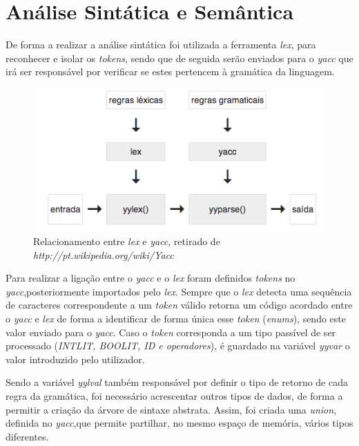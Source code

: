 \documentclass[12pt]{article}
\begin{document}
	
\pagebreak

\section{Análise Sintática e Semântica}
De forma a realizar a análise sintática foi utilizada a ferramenta \emph{lex}, para reconhecer e isolar os \emph{tokens}, sendo que de seguida serão enviados para o \emph{yacc} que irá ser responsável por verificar se estes pertencem à gramática da linguagem.


\begin{figure}[H]
       \centering
       \includegraphics[keepaspectratio=true, scale = 0.82]{lex_yacc.png}
       \caption{Relacionamento entre \emph{lex} e \emph{yacc}, retirado de \emph{http://pt.wikipedia.org/wiki/Yacc}}
       \end{figure}
       
Para realizar a ligação entre o \emph{yacc} e o \emph{lex} foram definidos \emph{tokens} no  \emph{yacc},posteriormente importados pelo \emph{lex}. Sempre que o \emph{lex} detecta uma sequência de caracteres correspondente a um \emph{token} válido retorna um código acordado entre o \emph{yacc} e \emph{lex} de forma a identificar de forma única esse \emph{token} (\emph{enums}), sendo este valor enviado para o \emph{yacc}. 
Caso o \emph{token} corresponda a um tipo passível de ser processado (\emph{INTLIT, BOOLIT, ID e operadores}), é guardado na variável \emph{yyvar} o valor introduzido pelo utilizador.

\par Sendo a variável \emph{yylval} também responsável por definir o tipo de retorno de cada regra da gramática, foi necessário acrescentar outros tipos de dados, de forma a permitir a criação da árvore de sintaxe abstrata. Assim, foi criada uma \emph{union}, definida no \emph{yacc},que permite partilhar, no mesmo espaço de memória, vários tipos diferentes.
\end{document}
